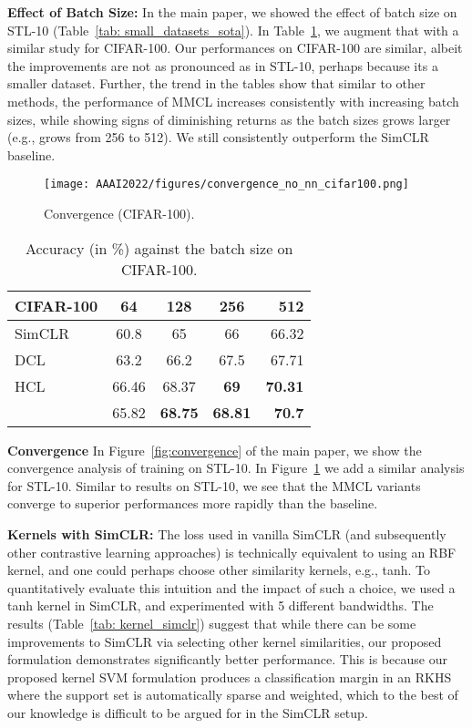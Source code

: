 \documentclass[letterpaper]{article} \usepackage{aaai22}  \usepackage{times}  \usepackage{helvet}  \usepackage{courier}  \usepackage[hyphens]{url}  \usepackage{graphicx} \urlstyle{rm} \def\UrlFont{\rm}  \usepackage{natbib}  \usepackage{caption} \DeclareCaptionStyle{ruled}{labelfont=normalfont,labelsep=colon,strut=off} \frenchspacing  \setlength{\pdfpagewidth}{8.5in}  \setlength{\pdfpageheight}{11in}
\begin{document}
\noindent\textbf{Effect of Batch Size:}
In the main paper, we showed the effect of batch size on STL-10 (Table~\ref{tab: small_datasets_sota}). In Table~\ref{tab: batchsize_cifar100}, we augment that with a similar study for CIFAR-100. Our performances on CIFAR-100 are similar, albeit the improvements are not as pronounced as in STL-10, perhaps because its a smaller dataset. Further, the trend in the tables show that similar to other methods, the performance of MMCL increases consistently with increasing batch sizes, while showing signs of diminishing returns as the batch sizes grows larger (e.g., grows from 256 to 512). We still consistently outperform the SimCLR baseline. 

\begin{figure}
    \centering
    \texttt{[image: AAAI2022/figures/convergence\_no\_nn\_cifar100.png]}
    \caption{Convergence (CIFAR-100).}
    \label{fig:convergence_CIFAR100}
\end{figure}
\begin{table}[]
    \centering
\begin{tabular}{lcccr}
            \toprule
            CIFAR-100  & 64 & 128 & 256 & 512 \\
            \midrule
            SimCLR  & 60.8 & 65 & 66 & 66.32  \\
            DCL  & 63.2 & 66.2 &  67.5 & 67.71 \\
            HCL  & 66.46 & 68.37 &  \textbf{69} & \textbf{70.31}\\
            \midrule
              & 65.82  & \textbf{68.75} & \textbf{68.81} & \textbf{70.7}\\
            \bottomrule
            \end{tabular}
    \caption{Accuracy (in \%) against the batch size on CIFAR-100.}
    \label{tab: batchsize_cifar100}
\end{table}

\noindent\textbf{Convergence}
In Figure~\ref{fig:convergence} of the main paper, we show the convergence analysis of training on STL-10. In Figure~\ref{fig:convergence_CIFAR100} we add a similar analysis for STL-10. Similar to results on STL-10, we see that the MMCL variants converge to superior performances more rapidly than the baseline. 

\noindent\textbf{Kernels with SimCLR:}
The loss used in vanilla SimCLR (and subsequently other contrastive learning approaches) is technically equivalent to using an RBF kernel, and one could perhaps choose other similarity kernels, e.g., tanh. To quantitatively evaluate this intuition and the impact of such a choice, we used a tanh kernel in SimCLR, and experimented with 5 different bandwidths. The results (Table~\ref{tab: kernel_simclr}) suggest that while there can be some improvements to SimCLR via selecting other kernel similarities, our proposed formulation demonstrates significantly better performance. This is because our proposed kernel SVM formulation produces a classification margin in an RKHS where the support set is automatically sparse and weighted, which to the best of our knowledge is difficult to be argued for in the SimCLR setup.
\end{document}
